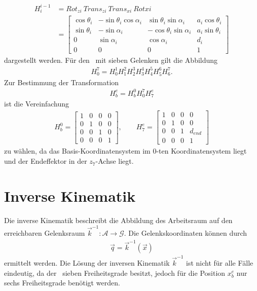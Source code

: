 \begin{align}
H_i^{i-1} &= Rot_{zi}\ Trans_{zi}\ Trans_{xi} \ Rot{xi}\\
			  &= \begin{bmatrix}
			  \cos\theta_i  & -\sin\theta_i \cos\alpha_i     & \sin \theta_i \sin \alpha_i & a_i \cos \theta_i \\
			  \sin\theta_i  & -\sin\alpha_i                  & -\cos \theta_i \sin \alpha_i & a_i \sin \theta_i \\
			  0             & \sin\alpha_i                   & \cos \alpha_i & d_i \\
			  0             & 0                              & 0 & 1 
			  \end{bmatrix}
\end{align}
dargestellt werden. Für den \kuka \ mit sieben Gelenken gilt die Abbildung
\begin{align}
H_0^7 = H_0^1 H_1^2 H_2^3 H_3^4 H_4^5 H_5^6 H_6^7.
\end{align}
Zur Bestimmung der Transformation 
\begin{align}
H_b^e = H_b^0 H_0^7 H_7^e 
\end{align}
ist die Vereinfachung 
\begin{align}
H_b^0 = \begin{bmatrix}
1            & 0             & 0 & 0 \\
0            & 1             & 0 & 0 \\
0            & 0             & 1 & 0 \\
0            & 0             & 0 & 1 
\end{bmatrix} , \qquad 
H_7^e = \begin{bmatrix}
1            & 0             & 0 & 0 \\
0            & 1             & 0 & 0 \\
0            & 0             & 1 & d_{end} \\
0            & 0             & 0 & 1 
\end{bmatrix}
\end{align}
zu wählen, da das Basis-Koordinatensystem im $0$-ten Koordinatensystem liegt und der Endeffektor in der $z_7$-Achse liegt. 
\section{Inverse Kinematik}
Die inverse Kinematik beschreibt die Abbildung des Arbeitsraum auf den erreichbaren Gelenksraum $ \vec{k}^{-1}:\mathcal{A} \rightarrow \mathcal{G}$. Die Gelenkskoordinaten können durch 
\begin{align}
\vec{q}=\vec{k}^{-1}(\vec{x})
\end{align}
ermittelt werden. Die Lösung der inversen Kinematik $\vec{k}^{-1}$ ist nicht für alle Fälle eindeutig, da der \kuka \ sieben Freiheitsgrade besitzt, jedoch für die Position $x_b^e$ nur sechs Freiheitsgrade benötigt werden.  

